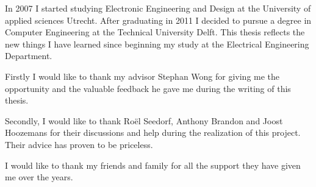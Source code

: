 

\vskip 1cm
In 2007 I started studying Electronic Engineering and Design at the University of applied sciences Utrecht. After graduating in 2011 I decided to pursue a degree in Computer Engineering at the Technical University Delft. This thesis reflects the new things I have learned since beginning my study at the Electrical Engineering Department.

Firstly I would like to thank my advisor Stephan Wong for giving me the opportunity and the valuable feedback he gave me during the writing of this thesis.

Secondly, I would like to thank Roël Seedorf, Anthony Brandon and Joost Hoozemans for their discussions and help during the realization of this project. Their advice has proven to be priceless.

I would like to thank my friends and family for all the support they have given me over the years.

\vskip 2cm
\noindent \AUTHOR \\
\PLACE \\
\DATE

